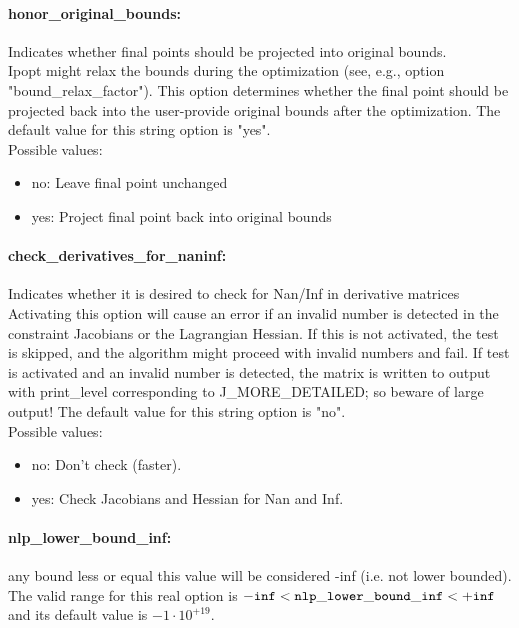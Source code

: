 \paragraph{honor\_original\_bounds:}\label{opt:honor_original_bounds} Indicates whether final points should be projected into original bounds. \\
 Ipopt might relax the bounds during the
optimization (see, e.g., option
"bound\_relax\_factor").  This option determines
whether the final point should be projected back
into the user-provide original bounds after the
optimization. The default value for this string option is "yes".
\\ 
Possible values:
\begin{itemize}
   \item no: Leave final point unchanged
   \item yes: Project final point back into original bounds
\end{itemize}

\paragraph{check\_derivatives\_for\_naninf:}\label{opt:check_derivatives_for_naninf} Indicates whether it is desired to check for Nan/Inf in derivative matrices \\
 Activating this option will cause an error if an
invalid number is detected in the constraint
Jacobians or the Lagrangian Hessian.  If this is
not activated, the test is skipped, and the
algorithm might proceed with invalid numbers and
fail.  If test is activated and an invalid number
is detected, the matrix is written to output with
print\_level corresponding to J\_MORE\_DETAILED;
so beware of large output! The default value for this string option is "no".
\\ 
Possible values:
\begin{itemize}
   \item no: Don't check (faster).
   \item yes: Check Jacobians and Hessian for Nan and Inf.
\end{itemize}

\paragraph{nlp\_lower\_bound\_inf:}\label{opt:nlp_lower_bound_inf} any bound less or equal this value will be considered -inf (i.e. not lower bounded). \\
 The valid range for this real option is 
${\tt -inf} <  {\tt nlp\_lower\_bound\_inf } <  {\tt +inf}$
and its default value is $-1 \cdot 10^{+19}$.


